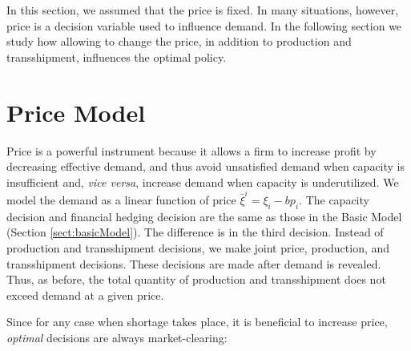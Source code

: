 \documentclass[mnsc,nonblindrev,copyedit]{informs2_wz} %
\newcommand{\OUT}[1]{}
\newcommand{\xiv}{\mbox{\boldmath$\xi$}}
\begin{document}
In this section, we assumed that the price is fixed.  In many situations, however, price is a decision variable used to influence demand.  In the following section we study how allowing to change the price, in addition to production and transshipment, influences the optimal policy.





\section{Price Model \label{sect:priceModel}}

Price is a powerful instrument because it allows a firm to increase profit by decreasing effective demand, and thus avoid unsatisfied demand when capacity is insufficient and, {\it vice versa}, increase demand when capacity is underutilized.  We model the demand as a linear function of price $\bar{\xi}^i = \xi_i - bp_i$.  The capacity decision and financial hedging decision are the same as those in the Basic Model (Section \ref{sect:basicModel}).  The difference is in the third decision.  Instead of production and transshipment decisions, we make joint price, production, and transshipment decisions.  These decisions are made after demand is revealed.  Thus, as before, the total quantity of production and transshipment does not exceed demand at a given price.
\OUT{
The problem can be formulated as follows:
\begin{eqnarray}
f(s,\bold{k,\xi}) &=& \max_{(\bold p, \bold y, \bold x) \in
B(\bold{k},\xiv)} J(\bold p, \bold y,\bold x) \label{eqn:fPrice}\\
J(\bold {p,y,x}) &=& (p^d-c)y^d + s(p^o-c)y^o + (s-1)c(x^o -x^d)\nonumber\\&& -t(x^o + x^d) \\
B(\bold{k},\xiv)& = &\{(\bold {p,y,x}): \; \bold p \geq 0,\;\bold
y \geq 0, \; \bold x \geq 0,\;  \bold y\leq \xiv-b\bold p, \nonumber \\
&& y_i \leq k_i+x_i-x_{j\neq i} \; \forall i \in \{o,d\} \forall j
\in \{o,d\}\}
\end{eqnarray}



The price and production decision problem cannot be solved independently, as choice of price determines the feasible region for production and transshipment decisions.  Taking advantage of the fact that it is always possible to avoid over-production, we further simplify the formulation by noting that

}
Since for any case when shortage takes place, it is beneficial to increase price, {\em optimal} decisions are always market-clearing:
\end{document}
